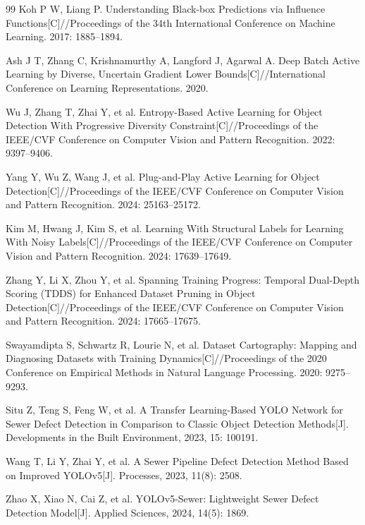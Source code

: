 \documentclass[UTF8,openany,12pt]{ctexbook}
\begin{document}
\begin{thebibliography}{99}
Koh P W, Liang P. Understanding Black-box Predictions via Influence Functions[C]//Proceedings of the 34th International Conference on Machine Learning. 2017: 1885--1894.

Ash J T, Zhang C, Krishnamurthy A, Langford J, Agarwal A. Deep Batch Active Learning by Diverse, Uncertain Gradient Lower Bounds[C]//International Conference on Learning Representations. 2020.

Wu J, Zhang T, Zhai Y, et al. Entropy-Based Active Learning for Object Detection With Progressive Diversity Constraint[C]//Proceedings of the IEEE/CVF Conference on Computer Vision and Pattern Recognition. 2022: 9397--9406.

Yang Y, Wu Z, Wang J, et al. Plug-and-Play Active Learning for Object Detection[C]//Proceedings of the IEEE/CVF Conference on Computer Vision and Pattern Recognition. 2024: 25163--25172.

Kim M, Hwang J, Kim S, et al. Learning With Structural Labels for Learning With Noisy Labels[C]//Proceedings of the IEEE/CVF Conference on Computer Vision and Pattern Recognition. 2024: 17639--17649.

Zhang Y, Li X, Zhou Y, et al. Spanning Training Progress: Temporal Dual-Depth Scoring (TDDS) for Enhanced Dataset Pruning in Object Detection[C]//Proceedings of the IEEE/CVF Conference on Computer Vision and Pattern Recognition. 2024: 17665--17675.

Swayamdipta S, Schwartz R, Lourie N, et al. Dataset Cartography: Mapping and Diagnosing Datasets with Training Dynamics[C]//Proceedings of the 2020 Conference on Empirical Methods in Natural Language Processing. 2020: 9275--9293.

Situ Z, Teng S, Feng W, et al. A Transfer Learning-Based YOLO Network for Sewer Defect Detection in Comparison to Classic Object Detection Methods[J]. Developments in the Built Environment, 2023, 15: 100191.

Wang T, Li Y, Zhai Y, et al. A Sewer Pipeline Defect Detection Method Based on Improved YOLOv5[J]. Processes, 2023, 11(8): 2508.

Zhao X, Xiao N, Cai Z, et al. YOLOv5-Sewer: Lightweight Sewer Defect Detection Model[J]. Applied Sciences, 2024, 14(5): 1869.


\end{thebibliography}
\end{document}
